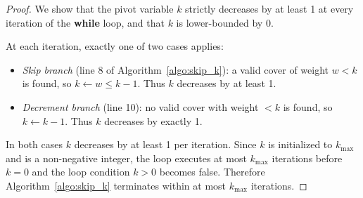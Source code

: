 \documentclass{ieeeaccess}
\newenvironment{prf}{\begin{proof}}{\end{proof}}
\begin{document}
\begin{prf}
We show that the pivot variable $k$ strictly decreases by
at least 1 at every iteration of the \textbf{while} loop,
and that $k$ is lower-bounded by 0.

At each iteration, exactly one of two cases applies:
\begin{itemize}
    \item \textit{Skip branch} (line 8 of
    Algorithm~\ref{algo:skip_k}): a valid cover of weight
    $w < k$ is found, so $k \leftarrow w \leq k - 1$.
    Thus $k$ decreases by at least 1.

    \item \textit{Decrement branch} (line 10):
    no valid cover with weight $< k$ is found, so
    $k \leftarrow k - 1$. Thus $k$ decreases by exactly 1.
\end{itemize}
In both cases $k$ decreases by at least 1 per iteration.
Since $k$ is initialized to $k_{\max}$ and is a
non-negative integer, the loop executes at most $k_{\max}$
iterations before $k = 0$ and the loop condition $k > 0$
becomes false. Therefore Algorithm~\ref{algo:skip_k}
terminates within at most $k_{\max}$ iterations.
\end{prf}
\end{document}
